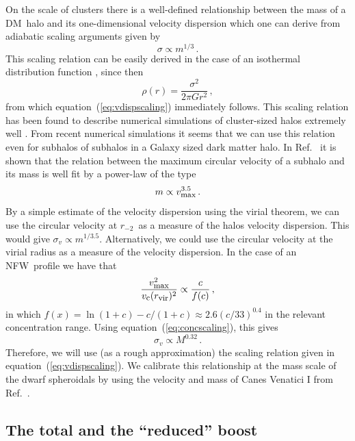\documentclass[aps,prd,twocolumn,amsmath,amssymb,floatfix,nofootinbib,10pt]{revtex4}
\newcommand{\NFW}{NFW}
\newcommand{\DM}{DM}
\newcommand{\eqnname}{equation}
\newcommand{\sigv}{\ensuremath{\sigma_v}}
\newcommand{\rminustwo}{\ensuremath{r_{-2}}}
\newcommand{\Rvir}{\ensuremath{r_{\mbox{{\footnotesize vir}}}}}
\newcommand{\vcirc}{\ensuremath{v_{\mbox{{\footnotesize c}}}}}
\newcommand{\vmax}{\ensuremath{v_{\mbox{{\footnotesize max}}}}}
\begin{document}
On the scale of clusters there is a well-defined relationship between
the mass of a \DM\ halo and its one-dimensional velocity dispersion
which one can derive from adiabatic scaling arguments
\cite{1998ApJ...495...80B} given by
\begin{equation}\label{eq:vdispscaling}
\sigma \propto m^{1/3}\, .
\end{equation}
This scaling relation can be easily derived in the case of an
isothermal distribution function \cite{2008gady.book.....B}, since
then
\begin{equation}
\rho(r) = \frac{\sigma^2}{2\pi G r^2}\, ,
\end{equation}
from which \eqnname\ (\ref{eq:vdispscaling}) immediately follows. This
scaling relation has been found to describe numerical simulations of
cluster-sized halos extremely well
\cite{1991ApJ...383...95E,1995MNRAS.275..720N,1995AJ....110...21C,1996ApJ...469..494E,1996MNRAS.281..716C,1998ApJ...495...80B}. From
recent numerical simulations it seems that we can use this relation
even for subhalos of subhalos in a Galaxy sized dark matter halo. In
Ref.~\cite{2008MNRAS.391.1685S} it is shown that the relation between
the maximum circular velocity of a subhalo and its mass is well fit by
a power-law of the type
\begin{equation}
m \propto \vmax^{3.5}\, .
\end{equation}
By a simple estimate of the velocity dispersion using the virial
theorem, we can use the circular velocity at \rminustwo\ as a measure
of the halos velocity dispersion. This would give $\sigv \propto
m^{1/3.5}$. Alternatively, we could use the circular velocity at the
virial radius as a measure of the velocity dispersion. In the case of
an \NFW\ profile we have that
\begin{equation}
\frac{\vmax^2}{\vcirc(\Rvir)^2} \propto \frac{c}{f(c)}\, ,
\end{equation}
in which $f(x) = \ln(1+c) - c/(1+c) \approx 2.6 (c/33)^{0.4}$ in the
relevant concentration range. Using \eqnname\ (\ref{eq:concscaling}),
this gives
\begin{equation}
\sigv \propto M^{0.32}\, .
\end{equation}
Therefore, we will use (as a rough approximation) the scaling relation
given in \eqnname\ (\ref{eq:vdispscaling}). We calibrate this
relationship at the mass scale of the dwarf spheroidals by using the
velocity and mass of Canes Venatici I from Ref.~\cite{2007ApJ...670..313S}.


\subsection{The total and the ``reduced'' boost}
\end{document}
